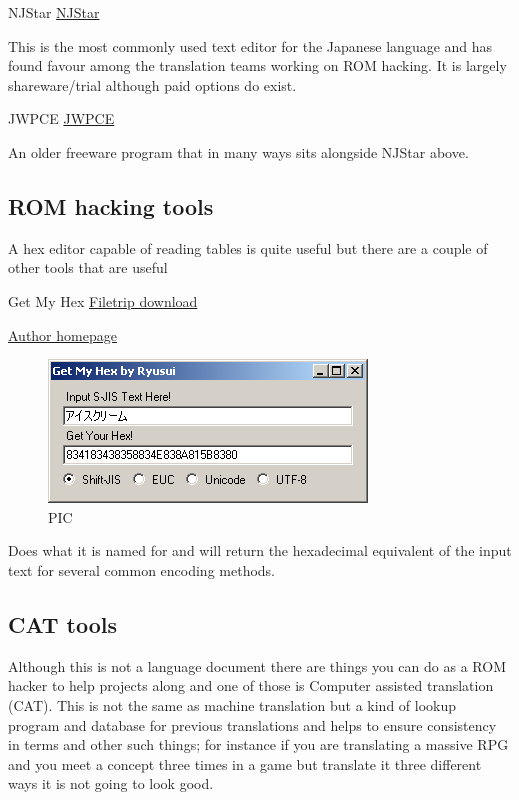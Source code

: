 \documentclass[
]{book}
\begin{document}
NJStar \href{http://www.njstar.com/cms/njstar-japanese-word-processor-download}{NJStar}

This is the most commonly used text editor for the Japanese language and has found favour among the translation teams working on ROM hacking. It is largely shareware/trial although paid options do exist.

JWPCE \href{http://www.physics.ucla.edu/~grosenth/japanese.html}{JWPCE}

An older freeware program that in many ways sits alongside NJStar above.

\hypertarget{rom-hacking-tools}{%
\subsection{ROM hacking tools}\label{rom-hacking-tools}}

A hex editor capable of reading tables is quite useful but there are a couple of other tools that are useful

Get My Hex \href{http://filetrip.net/pc-downloads/applications/download-getmyhex-1500-f29200.html}{Filetrip download}

\href{http://watercrown.info/}{Author homepage}

\begin{figure}
\centering
\includegraphics{images/134_home_fast6191_romhackingguide_unrenamed_files_and_original_borders_romhackingguidegetmyhex1.png}
\caption{PIC}
\end{figure}

Does what it is named for and will return the hexadecimal equivalent of the input text for several common encoding methods.

\hypertarget{cat-tools}{%
\subsection{CAT tools}\label{cat-tools}}

Although this is not a language document there are things you can do as a ROM hacker to help projects along and one of those is Computer assisted translation (CAT). This is not the same as machine translation but a kind of lookup program and database for previous translations and helps to ensure consistency in terms and other such things; for instance if you are translating a massive RPG and you meet a concept three times in a game but translate it three different ways it is not going to look good.
\end{document}
